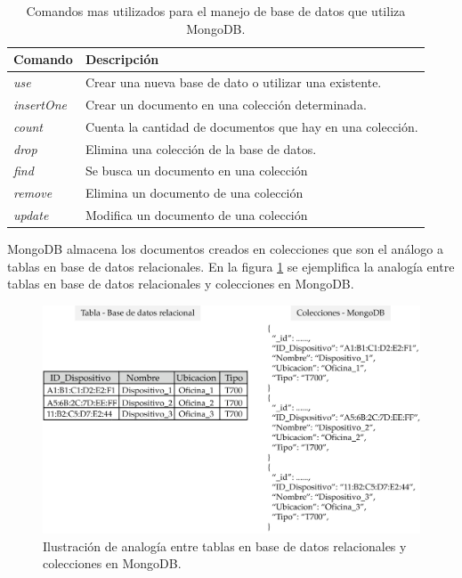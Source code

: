 \begin{table}[h]
	\centering
	\caption[Comandos utilizados en MongoDB]{Comandos mas utilizados para el manejo de base de datos que utiliza MongoDB.}
	\begin{tabular}{l l }    
		\toprule
		\textbf{Comando} 	 & \textbf{Descripción} 		\\
		\midrule
	
		\textit{use} 							& Crear una nueva base de dato o utilizar una existente.\\		
		\textit{insertOne}					& Crear un documento en una colección determinada.\\	
		\textit{count}						& Cuenta la cantidad de documentos que hay en una colección.\\	
		\textit{drop}							& Elimina una colección de la base de datos.\\	
		\textit{find	} 						& Se busca un documento en una colección\\
		\textit{remove}	 					& Elimina un documento de una colección\\
		\textit{update}						& Modifica un documento de una colección\\
		
		\bottomrule
		\hline
	\end{tabular}
	\label{tab:mongo-commands}
\end{table}

MongoDB almacena los documentos creados en colecciones que son el análogo a tablas en base de datos relacionales.  En la figura \ref{fig:tabla-coleccion} se ejemplifica la analogía entre tablas en base de datos relacionales y colecciones en MongoDB.

\begin{figure}[htpb]
	\centering
	\includegraphics[scale=.7]{./Figures/tabla-coleccion.png}
	\caption[Comparación tabla - colecciones en MongoDB ]{Ilustración de analogía entre tablas en base de datos relacionales y colecciones en MongoDB.}
	\label{fig:tabla-coleccion}
\end{figure}




